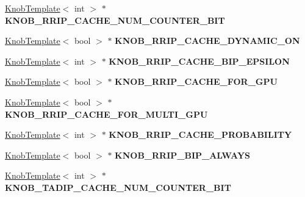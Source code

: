 \begin{DoxyCompactItemize}
\item 
\hypertarget{classall__knobs__c_a71786853970088dfaa84ca1657278e3b}{
\hyperlink{classKnobTemplate}{KnobTemplate}$<$ int $>$ $\ast$ {\bfseries KNOB\_\-RRIP\_\-CACHE\_\-NUM\_\-COUNTER\_\-BIT}}
\label{classall__knobs__c_a71786853970088dfaa84ca1657278e3b}

\item 
\hypertarget{classall__knobs__c_ae193c55f9723be14cab9ac667e2575f1}{
\hyperlink{classKnobTemplate}{KnobTemplate}$<$ bool $>$ $\ast$ {\bfseries KNOB\_\-RRIP\_\-CACHE\_\-DYNAMIC\_\-ON}}
\label{classall__knobs__c_ae193c55f9723be14cab9ac667e2575f1}

\item 
\hypertarget{classall__knobs__c_a4887ababcdd61f8acc8b2b72ead4ed3c}{
\hyperlink{classKnobTemplate}{KnobTemplate}$<$ int $>$ $\ast$ {\bfseries KNOB\_\-RRIP\_\-CACHE\_\-BIP\_\-EPSILON}}
\label{classall__knobs__c_a4887ababcdd61f8acc8b2b72ead4ed3c}

\item 
\hypertarget{classall__knobs__c_ac92ca0df3be4981f856f199eef10e231}{
\hyperlink{classKnobTemplate}{KnobTemplate}$<$ bool $>$ $\ast$ {\bfseries KNOB\_\-RRIP\_\-CACHE\_\-FOR\_\-GPU}}
\label{classall__knobs__c_ac92ca0df3be4981f856f199eef10e231}

\item 
\hypertarget{classall__knobs__c_a1cb2c6b8d915d7886e86cbd00e3a9a9c}{
\hyperlink{classKnobTemplate}{KnobTemplate}$<$ bool $>$ $\ast$ {\bfseries KNOB\_\-RRIP\_\-CACHE\_\-FOR\_\-MULTI\_\-GPU}}
\label{classall__knobs__c_a1cb2c6b8d915d7886e86cbd00e3a9a9c}

\item 
\hypertarget{classall__knobs__c_ad0d2855526ef5bac5c55e5c7a5e93d56}{
\hyperlink{classKnobTemplate}{KnobTemplate}$<$ int $>$ $\ast$ {\bfseries KNOB\_\-RRIP\_\-CACHE\_\-PROBABILITY}}
\label{classall__knobs__c_ad0d2855526ef5bac5c55e5c7a5e93d56}

\item 
\hypertarget{classall__knobs__c_a46ffb532f2ddb63d20608d5a9eeb9d8d}{
\hyperlink{classKnobTemplate}{KnobTemplate}$<$ bool $>$ $\ast$ {\bfseries KNOB\_\-RRIP\_\-BIP\_\-ALWAYS}}
\label{classall__knobs__c_a46ffb532f2ddb63d20608d5a9eeb9d8d}

\item 
\hypertarget{classall__knobs__c_a82519f0c0eb3767864209c499ff7ef71}{
\hyperlink{classKnobTemplate}{KnobTemplate}$<$ int $>$ $\ast$ {\bfseries KNOB\_\-TADIP\_\-CACHE\_\-NUM\_\-COUNTER\_\-BIT}}
\label{classall__knobs__c_a82519f0c0eb3767864209c499ff7ef71}


\end{DoxyCompactItemize}
